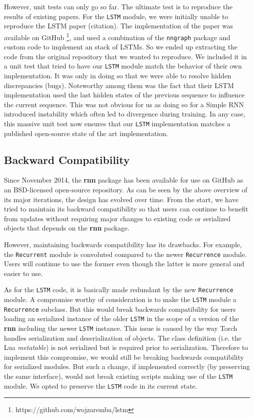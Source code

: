 \documentclass{article} %
\providecommand{\inlinecode}[1]{\texttt{#1}}
\begin{document}
However, unit tests can only go so far. The ultimate test is to reproduce the results of existing papers.
For the \inlinecode{LSTM} module, we were initially unable to reproduce the LSTM paper (citation). 
The implementation of the paper was available on GitHub \footnote{https://github.com/wojzaremba/lstm}, 
and used a combination of the \inlinecode{nngraph} package and 
custom code to implement an stack of LSTMs.
So we ended up extracting the code from the original repository that we wanted to reproduce.
We included it in a unit test that tried to have our \inlinecode{LSTM} module match the behavior 
of their own implementation. It was only in doing so that we were able to resolve hidden discrepancies (bugs).
Noteworthy among them was the fact that their LSTM implementation used the last hidden states of the 
previous sequence to influence the current sequence. This was not obvious for us as doing so for 
a Simple RNN introduced instability which often led to divergence during training.
In any case, this massive unit test now ensures that our \inlinecode{LSTM} implementation matches 
a published open-source state of the art implementation.

\subsection{Backward Compatibility}

Since November 2014, the \textbf{rnn} package has been available for use on GitHub as an BSD-licensed open-source repository.
As can be seen by the above overview of its major iterations, the design has evolved over time.
From the start, we have tried to maintain its backward compatibility so that users 
can continue to benefit from updates without requiring major changes to existing code 
or serialized objects that depends on the \textbf{rnn} package.

However, maintaining backwards compatibility has its drawbacks.
For example, the \inlinecode{Recurrent} module is convoluted compared to the newer 
\inlinecode{Recurrence} module. Users will continue to use the former even though 
the latter is more general and easier to use. 

As for the \inlinecode{LSTM} code, it is basically made redundant by the new \inlinecode{Recurrence} module.
A compromise worthy of consideration is to make the \inlinecode{LSTM}
module a \inlinecode{Recurrence} subclass. But this would break backwards compatibility
for users loading an serialized instance of the older \inlinecode{LSTM} 
in the scope of a version of the \textbf{rnn} including the newer \inlinecode{LSTM} instance.
This issue is caused by the way Torch handles serialization and deserialization of objects.
The class definition (i.e. the Lua \textit{metatable}) is not serialized but is required prior to 
serialization. Therefore to implement this compromise, we would still be breaking backwards compatibility 
for serialized modules. But such a change, if implemented correctly (by preserving the same interface), 
would not break existing scripts making use of the \inlinecode{LSTM} module. 
We opted to preserve the \inlinecode{LSTM} code in its current state.
\end{document}
